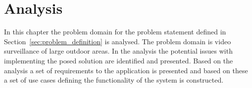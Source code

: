 \chapter{Analysis}
In this chapter the problem domain for the problem statement defined in Section~\ref{sec:problem_definition} is analysed.
The problem domain is video surveillance of large outdoor areas.
In the analysis the potential issues with implementing the posed solution are identified and presented.
Based on the analysis a set of requirements to the application is presented and based on these a set of use cases defining the functionality of the system is constructed.






